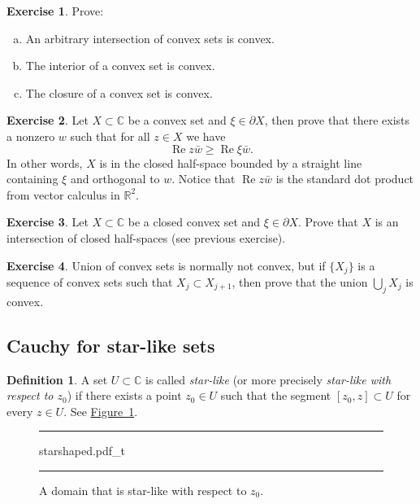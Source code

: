 \documentclass[12pt,openany]{book}
\renewcommand{\Re}{\operatorname{Re}}
\newcommand{\C}{{\mathbb{C}}}
\newcommand{\R}{{\mathbb{R}}}
\newcommand{\myindex}[1]{#1\index{#1}}
\theoremstyle{plain}
\theoremstyle{remark}
\theoremstyle{definition}
\newtheorem{defn}[thm]{Definition}
\newenvironment{exbox}{%
    \def\FrameCommand{\vrule width 1pt \relax\hspace {10pt}}%
    \MakeFramed {\advance \hsize -\width \FrameRestore }%
}{%
    \endMakeFramed
}
\newenvironment{exparts}{%
    \leavevmode\begin{enumerate}[a),noitemsep,topsep=0pt,parsep=0pt,partopsep=0pt]
}{%
    \end{enumerate}
}
\newenvironment{myfig}{%
\begin{figure}[h!t]
\noindent\rule{\textwidth}{0.4pt}\vspace{12pt}\par\centering}%
{\par\noindent\rule{\textwidth}{0.4pt}
\end{figure}}
\theoremstyle{exercise}
\newtheorem{exercise}{Exercise}[section]
\theoremstyle{example}
\newcommand{\figureref}[1]{\hyperref[#1]{Figure~\ref*{#1}}}
\begin{document}
\begin{exbox}
\begin{exercise}
Prove:
\begin{exparts}
\item
An arbitrary intersection of convex sets is convex.
\item
The interior of a convex set is convex.
\item
The closure of a convex set is convex.
\end{exparts}
\end{exercise}

\begin{exercise}
Let $X \subset \C$ be a convex set and $\xi \in \partial X$, then prove that
there exists a nonzero $w$ such that for all $z \in X$ we have
\begin{equation*}
\Re z\bar{w} \geq \Re \xi\bar{w} .
\end{equation*}
In other words, $X$ is in the closed half-space
bounded by a straight line containing $\xi$ and
orthogonal to $w$.
Notice that $\Re z\bar{w}$ is the standard dot product from
vector calculus in $\R^2$.
\end{exercise}

\begin{exercise}
Let $X \subset \C$ be a closed convex set and $\xi \in \partial X$.
Prove that $X$ is an intersection of closed half-spaces (see previous
exercise).
\end{exercise}

\begin{exercise}
Union of convex sets is normally not convex, but if $\{ X_j \}$ is a
sequence of convex sets such that $X_j \subset X_{j+1}$, then
prove that the union $\bigcup_j X_j$ is convex.
\end{exercise}
\end{exbox}

\subsection{Cauchy for star-like sets}

\begin{defn}
A set $U \subset \C$ is called \emph{\myindex{star-like}} (or more precisely
\emph{star-like with respect to $z_0$}) if there exists a
point $z_0 \in U$ such that the segment $[z_0,z] \subset U$ for every
$z \in U$.  See \figureref{fig:starshaped}.
\end{defn}

\begin{myfig}
{starshaped.pdf_t}
\caption{A domain that is star-like with respect to $z_0$.\label{fig:starshaped}}
\end{myfig}
\end{document}
